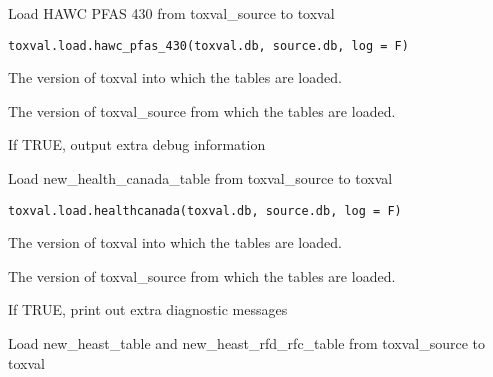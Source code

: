 \documentclass[letterpaper]{book}
\begin{document}
%
\begin{Description}\relax
Load HAWC PFAS 430 from toxval\_source to toxval
\end{Description}
%
\begin{Usage}
\begin{verbatim}
toxval.load.hawc_pfas_430(toxval.db, source.db, log = F)
\end{verbatim}
\end{Usage}
%
\begin{Arguments}
\begin{ldescription}
\item[\code{toxval.db}] The version of toxval into which the tables are loaded.

\item[\code{source.db}] The version of toxval\_source from which the tables are loaded.

\item[\code{verbose}] If TRUE, output extra debug information
\end{ldescription}
\end{Arguments}
%
\begin{Description}\relax
Load new\_health\_canada\_table from toxval\_source to toxval
\end{Description}
%
\begin{Usage}
\begin{verbatim}
toxval.load.healthcanada(toxval.db, source.db, log = F)
\end{verbatim}
\end{Usage}
%
\begin{Arguments}
\begin{ldescription}
\item[\code{toxval.db}] The version of toxval into which the tables are loaded.

\item[\code{source.db}] The version of toxval\_source from which the tables are loaded.

\item[\code{verbose}] If TRUE, print out extra diagnostic messages
\end{ldescription}
\end{Arguments}
%
\begin{Description}\relax
Load new\_heast\_table and new\_heast\_rfd\_rfc\_table from toxval\_source to toxval
\end{Description}
\end{document}
